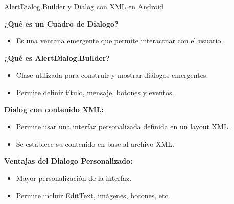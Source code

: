 \begin{frame}[fragile]{AlertDialog.Builder y Dialog con XML en Android}

\textbf{¿Qué es un Cuadro de Dialogo?} 
\begin{itemize} 
\item Es una ventana emergente que permite interactuar con el usuario. 
\end{itemize}

\textbf{¿Qué es AlertDialog.Builder?}
\begin{itemize}
    \item Clase utilizada para construir y mostrar diálogos emergentes.
    \item Permite definir título, mensaje, botones y eventos.
\end{itemize}


\textbf{Dialog con contenido XML:}
\begin{itemize}
    \item Permite usar una interfaz personalizada definida en un layout XML.
    \item Se establece su contenido en base al archivo XML.
\end{itemize}


\textbf{Ventajas del Dialogo Personalizado:}
\begin{itemize}
    \item Mayor personalización de la interfaz.
    \item Permite incluir EditText, imágenes, botones, etc.
\end{itemize}

\end{frame}



